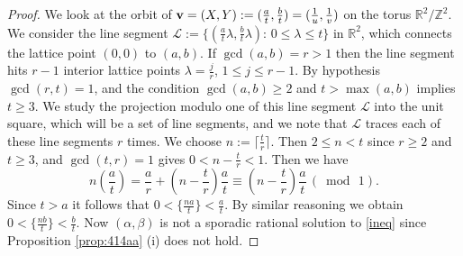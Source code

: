 \documentclass[12pt,letterpaper, reqno]{amsart}
\theoremstyle{definition}
\theoremstyle{remark}
\newcommand{\RR}{\ensuremath{\mathbb{R}}}
\newcommand{\ZZ}{\ensuremath{\mathbb{Z}}}
\newcommand{\sL}{{\mathcal L}}
\newcommand{\bv}{{\bf v}}
\begin{document}
\begin{proof} 
We look at the orbit of $\bv  = (X, Y) :=(\frac{a}{t}, \frac{b}{t}) = (\frac{1}{u}, \frac{1}{v} )$ on the torus $\RR^2/\ZZ^2$.
We consider the line segment  $\sL := \{ (\frac{a}{t} \lambda, \frac{b}{t} \lambda): \, 0 \le  \lambda \le t \}$
in $\RR^2$, which connects the lattice point $(0,0)$ to $(a, b)$. If $\gcd(a, b) = r>1$ then
the line segment hits $r-1$ interior lattice points  $\lambda= \frac{j}{r}$, $1\le  j \le r-1.$ 
By hypothesis $\gcd (r, t)=1$, and the condition $\gcd(a, b)\ge 2$ and $t > \max(a, b)$
implies $t \ge 3$.
We study the projection
modulo one of this line segment $\sL$ into the unit square, which will be a set of line segments, 
and we note that  $\sL$ traces each of these  line segments $r$ times. 
We choose $n := \lceil \frac{t}{r} \rceil$. Then $2 \le n < t$
since $r \ge 2$ and $t \ge 3$, and $\gcd(t, r) =1$ gives
$0 < n - \frac{t}{r} <1$. Then we have
$$
 n(\frac{a}{t}) = \frac{a}{r} + (n- \frac{t}{r}) \frac{a}{t} \equiv (n- \frac{t}{r}) \frac{a}{t} \, (\bmod \, 1).
$$
Since $t > a$ it  follows that $0 < \{ \frac{na}{t} \} < \frac{a}{t}$.
By similar reasoning we obtain $0 < \{ \frac{nb}{t} \} < \frac{b}{t}$.
Now $(\alpha, \beta)$ is not a sporadic rational solution to \eqref{ineq} since Proposition \ref{prop:414aa} (i)
does not hold. 
\end{proof}

\end{document}
